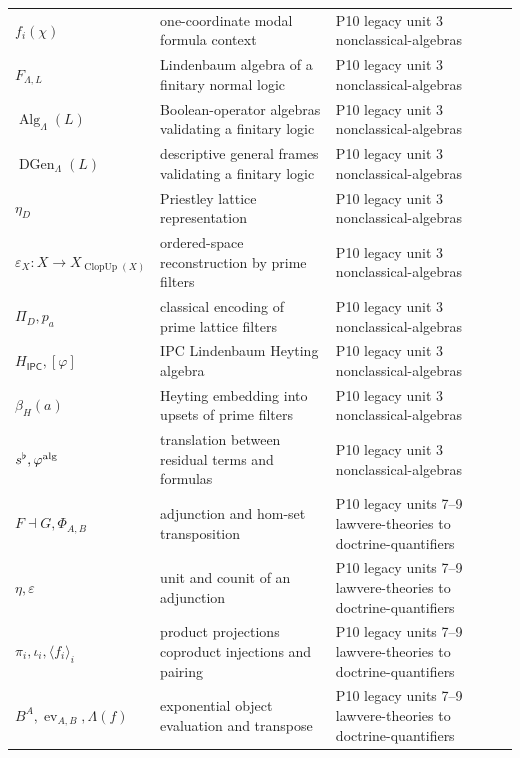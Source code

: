 \begin{longtable}{@{}p{}p{}p{}@{}}
\(f_i(\chi)\) & one-coordinate modal formula context & P10 legacy unit 3 nonclassical-\allowbreak{}algebras \\
\(F_{\Lambda,L}\) & Lindenbaum algebra of a finitary normal logic & P10 legacy unit 3 nonclassical-\allowbreak{}algebras \\
\(\operatorname{Alg}_\Lambda(L)\) & Boolean-operator algebras validating a finitary logic & P10 legacy unit 3 nonclassical-\allowbreak{}algebras \\
\(\operatorname{DGen}_\Lambda(L)\) & descriptive general frames validating a finitary logic & P10 legacy unit 3 nonclassical-\allowbreak{}algebras \\
\(\eta_D\) & Priestley lattice representation & P10 legacy unit 3 nonclassical-\allowbreak{}algebras \\
\(\varepsilon_X:X\to X_{\operatorname{ClopUp}(X)}\) & ordered-space reconstruction by prime filters & P10 legacy unit 3 nonclassical-\allowbreak{}algebras \\
\(\Pi_D,\allowbreak p_a\) & classical encoding of prime lattice filters & P10 legacy unit 3 nonclassical-\allowbreak{}algebras \\
\(H_{\mathsf{IPC}},\allowbreak [\varphi]\) & IPC Lindenbaum Heyting algebra & P10 legacy unit 3 nonclassical-\allowbreak{}algebras \\
\(\beta_H(a)\) & Heyting embedding into upsets of prime filters & P10 legacy unit 3 nonclassical-\allowbreak{}algebras \\
\(s^\flat,\allowbreak \varphi^{\rm alg}\) & translation between residual terms and formulas & P10 legacy unit 3 nonclassical-\allowbreak{}algebras \\
\(F\dashv G,\allowbreak \Phi_{A,B}\) & adjunction and hom-set transposition & P10 legacy units 7--9 lawvere-\allowbreak{}theories to doctrine-\allowbreak{}quantifiers \\
\(\eta,\allowbreak \varepsilon\) & unit and counit of an adjunction & P10 legacy units 7--9 lawvere-\allowbreak{}theories to doctrine-\allowbreak{}quantifiers \\
\(\pi_i,\allowbreak \iota_i,\allowbreak \langle f_i\rangle_i\) & product projections coproduct injections and pairing & P10 legacy units 7--9 lawvere-\allowbreak{}theories to doctrine-\allowbreak{}quantifiers \\
\(B^A,\allowbreak \operatorname{ev}_{A,B},\allowbreak \Lambda(f)\) & exponential object evaluation and transpose & P10 legacy units 7--9 lawvere-\allowbreak{}theories to doctrine-\allowbreak{}quantifiers \\

\end{longtable}
